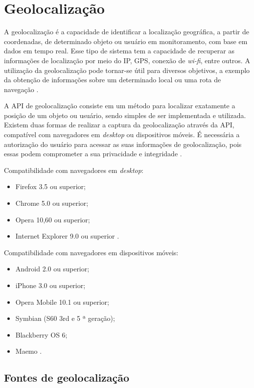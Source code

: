 \section{Geolocalização}
A geolocalização é a capacidade de identificar a localização geográfica, a partir de coordenadas, de determinado objeto ou usuário em monitoramento, com base em dados em tempo real. Esse tipo de sistema tem a capacidade de recuperar as informações de localização por meio do IP, GPS, conexão de \textit{wi-fi}, entre outros. A utilização da geolocalização pode tornar-se útil para diversos objetivos, a exemplo da obtenção de informações sobre um determinado local ou uma rota de navegação \cite{geolocalizacao:2011}.

A API de geolocalização consiste em um método para localizar exatamente a posição de um objeto ou usuário, sendo simples de ser implementada e utilizada. Existem duas formas de realizar a captura da geolocalização através da API, compatível com navegadores em \textit{desktop} ou dispositivos móveis. É necessária a autorização do usuário para acessar as suas informações de geolocalização, pois essas podem comprometer a sua privacidade e integridade \cite{geolocalizacao:2011}.

Compatibilidade com navegadores em \textit{desktop}:
\begin{itemize}
    \item Firefox 3.5 ou superior;
    \item Chrome 5.0 ou superior;
    \item Opera 10,60 ou superior;
    \item Internet Explorer 9.0 ou superior \cite{geolocalizacao:2011}. \\
\end{itemize}

Compatibilidade com navegadores em dispositivos móveis:
\begin{itemize}
    \item Android 2.0 ou superior;
    \item iPhone 3.0 ou superior;
    \item Opera Mobile 10.1 ou superior;
    \item Symbian (S60 3rd e 5 ª geração);
    \item Blackberry OS 6;
    \item Maemo \cite{geolocalizacao:2011}.
\end{itemize}

\subsection{Fontes de geolocalização}

